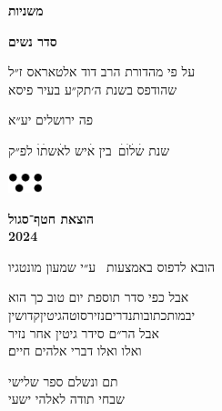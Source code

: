 \documentclass[14pt, a5paper, twoside, extrafontsizes]{memoir}
\begin{document}
\frontmatter
\pagestyle{myheadings}
\thispagestyle{mytitlepage}
\begin{hebrew}
{\Centering

  {\huge\bfseries משניות}

  {\LARGE\bfseries סדר נשים}

  \vspace{1em}

  \vspace{0.5em}
  על פי מהדורת הרב דוד אלטאראס ז״ל\\שהודפס בשנת ה׳תק״ע בעיר פיסא

    \vspace{8em}
    פה {\LARGE ירושלים} יע״א

    {\small שנת}
    {\Large שׄלׄוׄםׄ}\ בין {\Large אׄ}יש ל{\Large אׄ}ש{\Large תׄוׄ}
    {\small לפ״ק}

    \vspace{2em}
  \includegraphics[width=10mm]{hatafSegolLogoNoText.png}\\

    \vspace{.5em}
  {
    \bfseries הוצאת חטף־סגול\\2024

 {\footnotesize  הובא לדפוס באמצעות \XeLaTeX\ ע״י שמעון מונטגיו}

  }

}


\vspace{1em}
{
\parskip 2pt


\vspace{4pt}
       { \centering
         \small
  {\larger  אבל} כפי סדר תוספת יום טוב כך הוא\\
  יבמות\hdot כתובות\hdot נדרים\hdot נזיר\hdot סוטה\hdot גיטין\hdot קדושין\\
  אבל הר״ם סידר גיטין אחר נזיר\\
  ואלו ואלו דברי אלהים חיים׃}

}
\mainmatter
\thispagestyle{empty}










\def \sederCount{שלישי}


{\centering
  \LARGE תם ונשלם ספר שלישי\\שבחי תודה לאלהי ישעי
}

\end{hebrew}
\end{document}
